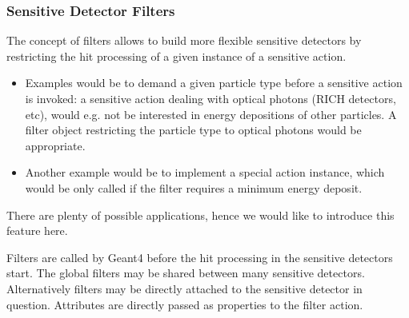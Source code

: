 \subsubsection{Sensitive Detector Filters}
\label{sec:ddg4-implementation-sensitive-detector-filters}

\noindent
The concept of filters allows to build more flexible sensitive detectors by
restricting the hit processing of a given instance of a sensitive action.

\begin{itemize}\itemcompact
\item Examples would be to demand a given particle type before a sensitive action is 
invoked: a sensitive action dealing with optical photons (RICH detectors, etc),
would e.g. not be interested in energy depositions of other particles.
A filter object restricting the particle type to optical photons would 
be appropriate.
\item Another example would be to implement a special action instance, which would
be only called if the filter requires a minimum energy deposit.
\end{itemize}
There are plenty of possible applications, hence we would like 
to introduce this feature here.

\noindent
Filters are called by Geant4 before the
hit processing in the sensitive detectors start. The global filters
may be shared between many sensitive detectors. Alternatively filters
may be directly attached to the sensitive detector in question.
Attributes are directly passed as properties to the filter action.

